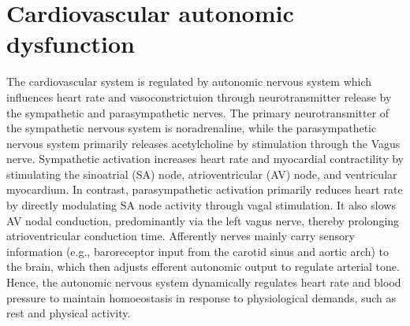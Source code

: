 \documentclass[
  a4paper,
  headsepline=true,
  open=any]{scrbook}
\begin{document}
\hypertarget{cardiovascular-autonomic-dysfunction}{%
\section{Cardiovascular autonomic
dysfunction}\label{cardiovascular-autonomic-dysfunction}}

The cardiovascular system is regulated by autonomic nervous system which
influences heart rate and vasoconstrictuion through neurotransmitter
release by the sympathetic and parasympathetic nerves. The primary
neurotransmitter of the sympathetic nervous system is noradrenaline,
while the parasympathetic nervous system primarily releases
acetylcholine by stimulation through the Vagus nerve. Sympathetic
activation increases heart rate and myocardial contractility by
stimulating the sinoatrial (SA) node, atrioventricular (AV) node, and
ventricular myocardium. In contrast, parasympathetic activation
primarily reduces heart rate by directly modulating SA node activity
through vagal stimulation. It also slows AV nodal conduction,
predominantly via the left vagus nerve, thereby prolonging
atrioventricular conduction time. Afferently nerves mainly carry sensory
information (e.g., baroreceptor input from the carotid sinus and aortic
arch) to the brain, which then adjusts efferent autonomic output to
regulate arterial tone. Hence, the autonomic nervous system dynamically
regulates heart rate and blood pressure to maintain homoeostasis in
response to physiological demands, such as rest and physical activity.
\end{document}
